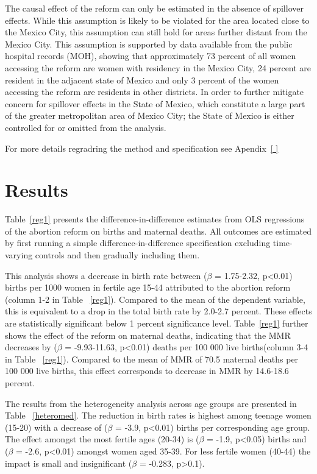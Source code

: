\documentclass[a4paper, 11pt]{article}
\begin{document}
\begin{spacing}{1.5}
\begin{multicols}{2}
The causal effect of the reform can only be estimated in the absence of spillover effects. While this assumption is likely to be violated for the area located close to the Mexico City, this assumption can still hold for areas further distant from the Mexico City. This assumption is supported by data available from the public hospital records (MOH), showing that approximately 73 percent of all women accessing the reform are women with residency in the Mexico City, 24 percent are resident in the adjacent state of Mexico and only 3 percent of the women accessing the reform are residents in other districts. In order to further mitigate concern for spillover effects in the State of Mexico, which constitute a large part of the greater metropolitan area of Mexico City; the State of Mexico is either controlled for or omitted from the analysis. 

For more details regradring the method and specification see Apendix~\ref{ }  
 
 
 \section{Results}
Table~\ref{reg1} presents the difference-in-difference estimates from OLS regressions of the abortion reform on births and maternal deaths. All outcomes are estimated by first running a simple difference-in-difference specification excluding time-varying controls and then gradually including them. 

This analysis shows a decrease in birth rate between ($\beta$ = 1.75-2.32, p<0.01) births per 1000 women in fertile age 15-44 attributed to the abortion reform (column 1-2 in Table ~\ref{reg1}). Compared to the mean of the dependent variable, this is equivalent to a drop in the total birth rate by 2.0-2.7 percent. These effects are statistically significant below 1 percent significance level. Table~\ref{reg1} further shows the effect of the reform on maternal deaths, indicating that the MMR decreases by ($\beta$ = -9.93-11.63, p<0.01)  deaths per 100 000 live births(column 3-4 in Table ~\ref{reg1}). Compared to the mean of MMR of 70.5 maternal deaths per 100 000 live births, this effect corresponds to decrease in MMR by 14.6-18.6 percent.

The results from the heterogeneity analysis across age groups are presented in Table ~\ref{heteromed}. The reduction in birth rates is highest among teenage women (15-20) with a decrease of ($\beta$ = -3.9, p<0.01) births per corresponding age group. The effect amongst the most fertile ages (20-34) is ($\beta$ = -1.9, p<0.05) births and  ($\beta$ = -2.6, p<0.01) amongst women aged 35-39. For less fertile women (40-44) the impact is small and insignificant ($\beta$ = -0.283, p>0.1).


\end{multicols}
\end{spacing}
\end{document}
